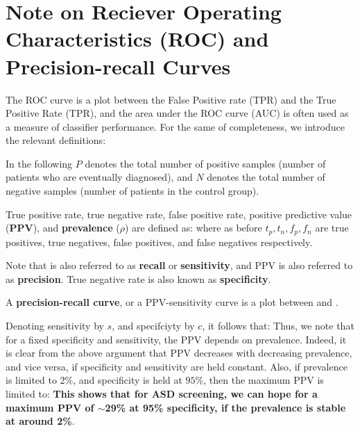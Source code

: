 \documentclass[3p,super,numbers,sort&compress,preprint,10pt]{elsarticle}
\begin{document}
\section{Note on Reciever Operating Characteristics (ROC) and Precision-recall  Curves}\label{sec:ROC}

The ROC curve is a plot between the False Positive rate (TPR) and the True Positive Rate (TPR), and the area under the ROC curve (AUC) is often used as a measure of classifier performance. For the same of completeness, we introduce the relevant definitions:

In the following $P$ denotes the total number of positive samples (number of patients who are eventually diagnosed), and $N$ denotes the total number of negative  samples (number of patients in the control group).
\begin{defn}
  True positive rate, true negative rate, false positive rate,  positive predictive value (\textbf{PPV}), and \textbf{prevalence} ($\rho$) are defined as: 
  where as before $t_p,t_n,f_p,f_n$ are true positives, true negatives, false positives, and false negatives respectively. 
\end{defn}
%
Note that \TPR is also referred to as \textbf{recall} or \textbf{sensitivity}, and PPV is also referred to as \textbf{precision}. True negative rate is also known as \textbf{specificity}.

A \textbf{precision-recall curve}, or a PPV-sensitivity curve is a plot between \PPV and \TPR.

Denoting sensitivity by $s$, and specifciyty by $c$, it follows that:
%
Thus, we note that for a fixed specificity and sensitivity, the PPV depends on prevalence. Indeed, it is clear from the above argument that PPV decreases with decreasing prevalence, and vice versa, if specificity and sensitivity are held constant. Also, if prevalence is limited to 2\%, and specificity is held at $95\%$, then the maximum PPV is limited to:
%
\textbf{This shows that for ASD screening, we can hope for a maximum PPV of $\sim$29\% at 95\% specificity, if the prevalence is stable at around 2\%}.
\end{document}
